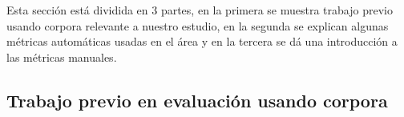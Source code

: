 Esta secci\'on est\'a dividida en 3 partes, en la primera se muestra trabajo previo usando corpora relevante a nuestro estudio, en la segunda se explican algunas m\'etricas autom\'aticas usadas en el \'area y en la tercera se d\'a una introducci\'on a las m\'etricas manuales.

\subsection{Trabajo previo en evaluaci\'on usando corpora}\label{sec:2_3_1}
%

%
%

